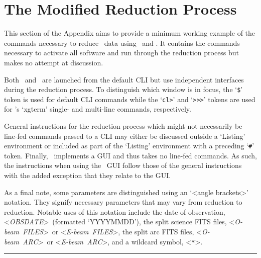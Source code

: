 \chapter{The Modified Reduction Process} \label{app:reduction}

\newcommand{\obj}{<\textit{OBJ}>}
\newcommand{\obsdate}{<\textit{OBSDATE}>}

\newcommand{\oarc}{<\textit{O-beam~ARC}>}
\newcommand{\earc}{<\textit{E-beam~ARC}>}
\newcommand{\ofiles}{<\textit{O-beam~FILES}>}
\newcommand{\efiles}{<\textit{E-beam~FILES}>}
\newcommand{\file}{<\textit{FILE(S)}>}

\newcommand{\id}{01\_identify.cl}
\newcommand{\reid}{02\_reidentify.cl}
\newcommand{\fit}{03\_fitcoords.cl}
\newcommand{\tran}{04\_transform.cl}

This section of the Appendix aims to provide a minimum working example of the commands necessary to reduce \polsalt\ data using \stops\ and \iraf. It contains the commands necessary to activate all software and run through the reduction process but makes no attempt at discussion.

Both \polsalt\ and \iraf\ are launched from the default \gls{CLI} but use independent interfaces during the reduction process. To distinguish which window is in focus, the `\texttt{\$}' token is used for default \gls{CLI} commands while the `\texttt{cl>}' and `\texttt{>\->\->}' tokens are used for \iraf's `xgterm' single- and multi-line commands, respectively.

General instructions for the reduction process which might not necessarily be line-fed commands passed to a \gls{CLI} may either be discussed outside a `Listing' environment or included as part of the `Listing' environment with a preceding `\texttt{\#}' token. Finally, \polsalt\ implements a \gls{GUI} and thus takes no line-fed commands. As such, the instructions when using the \polsalt\ \gls{GUI} follow those of the general instructions with the added exception that they relate to the \gls{GUI}.

As a final note, some parameters are distinguished using an `<angle brackets>' notation. They signify necessary parameters that may vary from reduction to reduction. Notable uses of this notation include the date of observation, \obsdate\ (formatted `YYYYMMDD'), the split science \gls{FITS} files, \ofiles\ or \efiles, the split arc \gls{FITS} files, \oarc\ or \earc, and a wildcard symbol, <\texttt{*}>.

\vspace{\baselineskip}\hrule\vspace{\baselineskip}

